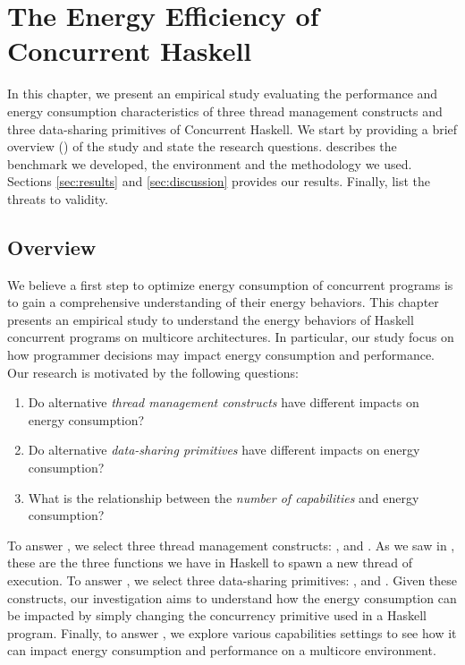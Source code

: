 \chapter{The Energy Efficiency of Concurrent Haskell}
In this chapter, we present an empirical study evaluating the performance and energy consumption characteristics of three thread management constructs and three data-sharing primitives of Concurrent Haskell. We start by providing a brief overview () of the study and state the research questions.  describes the benchmark we developed, the environment and the methodology we used. Sections \ref{sec:results} and \ref{sec:discussion} provides our results. Finally,  list the threats to validity.

\section{Overview}\label{sec:overview}

We believe a first step to optimize energy consumption of concurrent programs is to gain a comprehensive understanding of their energy behaviors. This chapter presents an empirical study to understand the energy behaviors of Haskell concurrent programs on multicore architectures. In particular, our study focus on how programmer decisions may impact energy consumption and performance. Our research is motivated by the following questions:

\begin{enumerate}[label=\RQ{\arabic*}.]
  \item Do alternative \textit{thread management constructs} have different impacts on energy consumption?
  \item Do alternative \textit{data-sharing primitives} have different impacts on energy consumption?
  \item What is the relationship between the \textit{number of capabilities} and energy consumption?
\end{enumerate}

To answer , we select three thread management constructs: \forkIO, \forkOn and \forkOS. As we saw in , these are the three functions we have in Haskell to spawn a new thread of execution. To answer , we select three data-sharing primitives: \MVar, \TMVar and \TVar. Given these constructs, our investigation aims to understand how the energy consumption can be impacted by simply changing the concurrency primitive used in a Haskell program. Finally, to answer , we explore various capabilities settings to see how it can impact energy consumption and performance on a multicore environment.


